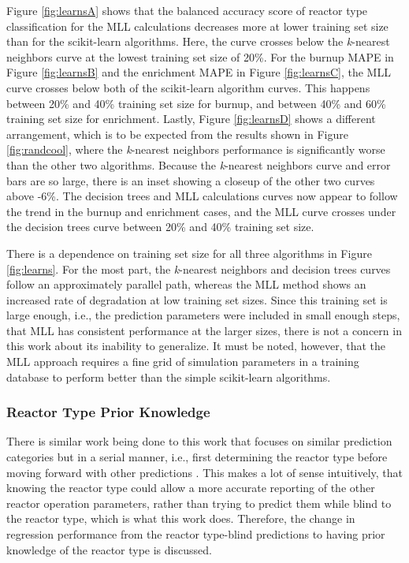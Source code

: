 Figure \ref{fig:learnsA} shows that the balanced accuracy score of reactor type
classification for the \gls{MLL} calculations decreases more at lower training
set size than for the scikit-learn algorithms. Here, the curve crosses below
the \textit{k}-nearest neighbors curve at the lowest training set size of 20\%.
For the burnup \gls{MAPE} in Figure \ref{fig:learnsB} and the enrichment
\gls{MAPE} in Figure \ref{fig:learnsC}, the \gls{MLL} curve crosses below both
of the scikit-learn algorithm curves. This happens between 20\% and 40\%
training set size for burnup, and between 40\% and 60\% training set size for
enrichment.  Lastly, Figure \ref{fig:learnsD} shows a different arrangement,
which is to be expected from the results shown in Figure \ref{fig:randcool},
where the \textit{k}-nearest neighbors performance is significantly worse than
the other two algorithms. Because the \textit{k}-nearest neighbors curve and
error bars are so large, there is an inset showing a closeup of the other two
curves above -6\%.  The decision trees and \gls{MLL} calculations curves now
appear to follow the trend in the burnup and enrichment cases, and the
\gls{MLL} curve crosses under the decision trees curve between 20\% and 40\%
training set size.  

There is a dependence on training set size for all three algorithms in Figure
\ref{fig:learns}. For the most part, the \textit{k}-nearest neighbors and
decision trees curves follow an approximately parallel path, whereas the
\gls{MLL} method shows an increased rate of degradation at low training set
sizes. Since this training set is large enough, i.e., the prediction parameters
were included in small enough steps, that \gls{MLL} has consistent performance
at the larger sizes, there is not a concern in this work about its inability to
generalize. It must be noted, however, that the \gls{MLL} approach requires a
fine grid of simulation parameters in a training database to perform better
than the simple scikit-learn algorithms.

\subsubsection{Reactor Type Prior Knowledge}
\label{sec:randerrD}

There is similar work being done to this work that focuses on similar
prediction categories but in a serial manner, i.e., first determining the
reactor type before moving forward with other predictions \cite{serial_ml}.
This makes a lot of sense intuitively, that knowing the reactor type could
allow a more accurate reporting of the other reactor operation parameters,
rather than trying to predict them while blind to the reactor type, which is
what this work does. Therefore, the change in regression performance from the
reactor type-blind predictions to having prior knowledge of the reactor type is
discussed.

